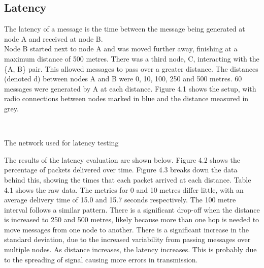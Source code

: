 \documentclass[12pt,a4paper]{report}
\makeatletter
\newenvironment{figurehere}
  {\def\@captype{figure}}
  {}
\makeatother
\begin{document}
\subsection{Latency}
The latency of a message is the time between the message being generated at node A and received at node B. \\
Node B started next to node A and was moved further away, finishing at a maximum distance of 500 metres. There was a third node, C, interacting with the \{A, B\} pair. This allowed messages to pass over a greater distance. The distances (denoted d) between nodes A and B were 0, 10, 100, 250 and 500 metres. 60 messages were generated by A at each distance. Figure 4.1 shows the setup, with radio connections between nodes marked in blue and the distance measured in grey. 
\begin{figurehere}
\begin{center}
 \\
\end{center}
\caption{The network used for latency testing}
\end{figurehere}
\FloatBarrier
\bigskip
The results of the latency evaluation are shown below. Figure 4.2 shows the percentage of packets delivered over time. Figure 4.3 breaks down the data behind this, showing the times that each packet arrived at each distance. Table 4.1 shows the raw data. The metrics for 0 and 10 metres differ little, with an average delivery time of 15.0 and 15.7 seconds respectively. The 100 metre interval follows a similar pattern. There is a significant drop-off when the distance is increased to 250 and 500 metres, likely because more than one hop is needed to move messages from one node to another. There is a significant increase in the standard deviation, due to the increased variability from passing messages over multiple nodes. As distance increases, the latency increases. This is probably due to the spreading of signal causing more errors in transmission. \\
\end{document}
